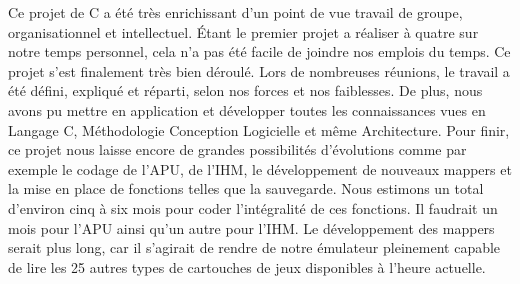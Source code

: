 Ce projet de C a été très enrichissant d'un point de vue travail de groupe, organisationnel et intellectuel. Étant le premier projet a réaliser à quatre sur notre temps personnel, cela n'a pas été facile de joindre nos emplois du temps. Ce projet s'est finalement très bien déroulé. Lors de nombreuses réunions, le travail a été défini, expliqué et réparti, selon nos forces et nos faiblesses. De plus, nous avons pu mettre en application et développer toutes les connaissances vues en Langage C, Méthodologie Conception Logicielle et même Architecture. Pour finir, ce projet nous laisse encore de grandes possibilités d'évolutions comme par exemple le codage de l'APU, de l'IHM, le développement de nouveaux mappers et la mise en place de fonctions telles que la sauvegarde. Nous estimons un total d'environ cinq à six mois pour coder l'intégralité de ces fonctions. Il faudrait un mois pour l'APU ainsi qu'un autre pour l'IHM. Le développement des mappers serait plus long, car il s'agirait de rendre de notre émulateur pleinement capable de lire les 25 autres types de cartouches de jeux disponibles à l'heure actuelle.
